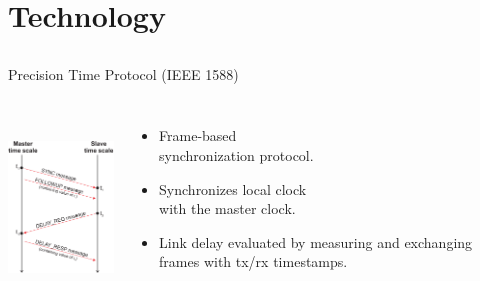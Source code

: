 \documentclass[compress, red]{beamer}
\begin{document}
\section{Technology}
\subsection{}

\begin{frame}{Precision Time Protocol (IEEE 1588)}

\begin{columns}[c]
  \column{1.5in}
      \begin{center}
	\includegraphics[height=5cm]{../../figures/protocol/ptp_exchange.pdf}
      \end{center}
  \column{2.5in}
      \begin{itemize}
	  \item Frame-based \\ synchronization protocol.
	  \item Synchronizes local clock \\ with the master clock.
	  \item Link delay evaluated by measuring and exchanging
            frames with tx/rx timestamps.
      \end{itemize}
  \end{columns}
\end{frame}
\end{document}
